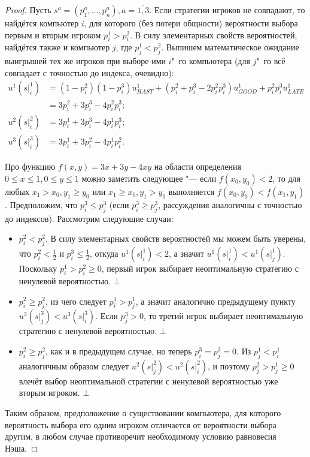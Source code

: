 \begin{proof}
	Пусть $s^a = (p_1^a, \ldots, p_n^a), a = \overline{1,3}$. Если стратегии игроков не совпадают, то найдётся компьютер $i$, для которого (без потери общности) вероятности выбора первым и вторым игроком $p_i^1 > p_i^2$. В силу элементарных свойств вероятностей, найдётся также и компьютер $j$, где $p_j^1 < p_j^2$. Выпишем математическое ожидание выигрышей тех же игроков при выборе ими $i$"~го компьютера (для $j$"~го всё совпадает с точностью до индекса, очевидно):
	\begin{align*}
		u^1(\left. s \right|^1_i) &= (1 - p_i^2) (1 - p_i^3) u^1_{HAST} + (p_i^2 + p_i^3 - 2 p_i^2 p_i^3) u^1_{GOOD} + p_i^2 p_i^3 u^1_{LATE}\\ &= 3 p_i^2 + 3 p_i^3 - 4 p_i^2 p_i^3;\\
		u^2(\left. s \right|^2_i) &= 3 p_i^1 + 3 p_i^3 - 4 p_i^1 p_i^3;\\
		u^3(\left. s \right|^3_i) &= 3 p_i^1 + 3 p_i^2 - 4 p_i^1 p_i^2.
	\end{align*}
	
	Про функцию $f(x,y) = 3x + 3y - 4xy$ на области определения $0 \le x \le 1, 0 \le y \le 1$ можно заметить следующее "--- если $f(x_0, y_0) < 2$, то для любых $x_1 > x_0, y_1 \ge y_0$ или $x_1 \ge x_0, y_1 > y_0$ выполняется $f(x_0, y_0) < f(x_1, y_1)$. Предположим, что $p_i^3 \le p_j^3$ (если $p_i^3 \ge p_j^3$, рассуждения аналогичны с точностью до индексов). Рассмотрим следующие случаи:
	\begin{itemize}
		\item $p_i^2 < p_j^2$. В силу элементарных свойств вероятностей мы можем быть уверены, что $p_i^2 < \frac{1}{2}$ и $p_i^3 \le \frac{1}{2}$, откуда $u^1(\left. s \right|^1_i) < 2$, а значит $u^1(\left. s \right|^1_i) < u^1(\left. s \right|^1_j)$. Поскольку $p_i^1 > p_i^2 \ge 0$, первый игрок выбирает неоптимальную стратегию с ненулевой вероятностью. $\bot$
		\item $p_i^2 \ge p_j^2$, из чего следует $p_i^1 > p_j^1$, а значит аналогично предыдущему пункту $u^3(\left. s \right|^3_j) < u^3(\left. s \right|^3_i)$. Если $p_j^3 > 0$, то третий игрок выбирает неоптимальную стратегию с ненулевой вероятностью. $\bot$
		\item $p_i^2 \ge p_j^2$, как и в предыдущем случае, но теперь $p_i^3 = p_j^3 = 0$. Из $p_j^1 < p_i^1$ аналогичным образом следует $u^2(\left. s \right|^2_j) < u^2(\left. s \right|^2_i)$, и поэтому $p_j^2 > p_j^1 \ge 0$ влечёт выбор неоптимальной стратегии с ненулевой вероятностью уже вторым игроком. $\bot$
	\end{itemize}
	
	Таким образом, предположение о существовании компьютера, для которого вероятность выбора его одним игроком отличается от вероятности выбора другим, в любом случае противоречит необходимому условию равновесия Нэша.
\end{proof}

